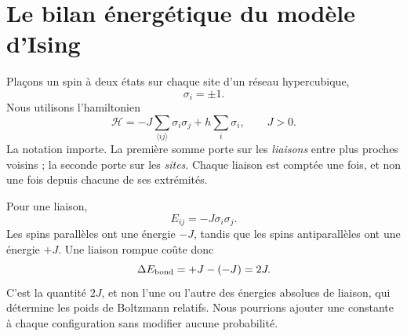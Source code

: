\section{Le bilan énergétique du modèle d’Ising}

Plaçons un spin à deux états sur chaque site d’un réseau hypercubique,
\begin{equation}
\sigma_i=\pm1.
\end{equation}
Nous utilisons l’hamiltonien
\begin{equation}
\mathcal H
=-J\sum_{\langle ij\rangle}\sigma_i\sigma_j
+h\sum_i\sigma_i,
\qquad J>0.
\label{eq:ising-hamiltonian}
\end{equation}
La notation importe. La première somme porte sur les \emph{liaisons} entre plus proches voisins ; la seconde porte sur les \emph{sites}. Chaque liaison est comptée une fois, et non une fois depuis chacune de ses extrémités.

Pour une liaison,
\begin{equation}
E_{ij}=-J\sigma_i\sigma_j.
\end{equation}
Les spins parallèles ont une énergie \(-J\), tandis que les spins antiparallèles ont une énergie \(+J\). Une liaison rompue coûte donc
\begin{equation}
\Delta E_{\rm bond}=+J-(-J)=2J.
\label{eq:broken-bond}
\end{equation}
C’est la quantité \(2J\), et non l’une ou l’autre des énergies absolues de liaison, qui détermine les poids de Boltzmann relatifs. Nous pourrions ajouter une constante à chaque configuration sans modifier aucune probabilité.

\begin{classroomqa}
\end{classroomqa}

\begin{classroomqa}
\end{classroomqa}

